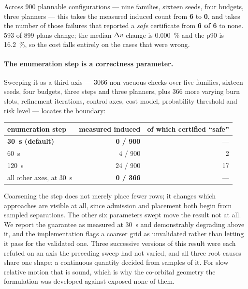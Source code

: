 Across \num{900} plannable configurations --- nine families, sixteen seeds,
four budgets, three planners --- this takes the measured induced count from
\textbf{6} to \textbf{0}, and takes the number of those failures that reported
a \emph{safe} certificate from \textbf{6 of 6} to none. \num{593} of \num{899}
plans change; the median $\Delta v$ change is \SI{+0.000}{\percent} and the p90 is
\SI{+16.2}{\percent}, so the cost falls entirely on the cases that were wrong.

\paragraph{The enumeration step is a correctness parameter.} Sweeping it as a
third axis --- \num{3066} non-vacuous checks over five families, sixteen seeds,
four budgets, three steps and three planners, plus \num{366} more varying burn
slots, refinement iterations, control axes, cost model, probability threshold
and risk level --- locates the boundary:

\begin{center}
\begin{tabular}{lrr}
\toprule
enumeration step & measured induced & of which certified ``safe'' \\
\midrule
\textbf{\SI{30}{\second} (default)} & \textbf{0 / 900} & --- \\
\SI{60}{\second}  &  4 / 900 & 2 \\
\SI{120}{\second} & 24 / 900 & 17 \\
all other axes, at \SI{30}{\second} & \textbf{0 / 366} & --- \\
\bottomrule
\end{tabular}
\end{center}

Coarsening the step does not merely place fewer rows; it changes which
approaches are visible at all, since admission and placement both begin from
sampled separations. The other six parameters swept move the result not at all.
We report the guarantee as measured at \SI{30}{\second} and demonstrably
degrading above it, and the implementation flags a coarser grid as unvalidated
rather than letting it pass for the validated one. Three successive versions of
this result were each refuted on an axis the preceding sweep had not varied,
and all three root causes share one shape: a continuous quantity decided from
samples of it. For slow relative motion that is sound, which is why the
co-orbital geometry the formulation was developed against exposed none of them.

